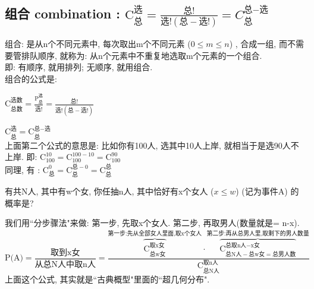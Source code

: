 \documentclass[UTF8]{ctexart}
\begin{document}
	
	
	
	

	\subsection{组合 combination : $
		\text{C}_{\text{总}}^{\text{选}}=\frac{\text{总!}}{\text{选!}\left( \text{总}-\text{选!} \right)}	= C_{\text{总}}^{\text{总}-\text{选}}	$}
	
	组合: 是从n个不同元素中, 每次取出m个不同元素 ($0 \leq m \leq n$) , 合成一组, 而不需要管排队顺序, 就称为: 从n个元素中不重复地选取m个元素的一个组合. \\
	
	即: 有顺序, 就用排列; 无顺序, 就用组合. \\
	
	组合的公式是: 
	
$\boxed{
		\text{C}_{\text{总数}}^{\text{选数}}=\frac{\text{P}_{\text{总}}^{\text{选}}}{\text{选!}}=\frac{\text{总!}}{\text{选!}\left( \text{总}-\text{选!} \right)}	
}$

$\boxed{
		\text{C}_{\text{总}}^{\text{选}}=\text{C}_{\text{总}}^{\text{总}-\text{选}}	
}$ \\

上面第二个公式的意思是: 比如你有100人, 选其中10人上岸, 就相当于是选90人不上岸. 即: $\text{C}_{100}^{10}=\text{C}_{100}^{100-10}=\text{C}_{100}^{90}
$ \\

同理, 有 : $
\boxed{\text{C}_{\text{总}}^{0}=\text{C}_{\text{总}}^{\text{总}-0}=\text{C}_{\text{总}}^{\text{总}}
}$ \\
	
	
	\begin{myEnvSample}
		有共N人, 其中有w个女, 你任抽n人, 其中恰好有x个女人 ($x \leq w$) (记为事件A) 的概率是? 
		
		我们用``分步骤法"来做: 第一步, 先取x个女人. 第二步, 再取男人(数量就是= n-x). \\

$
\text{P(A)}=\dfrac{\text{取到x女}}{\text{从总N人中取n人}}=\dfrac{\overset{\text{第一步:先从全部女人里面,取x个女人}}{\overbrace{\text{C}_{\text{总w女}}^{\text{取x女}}}}\cdot \overset{\text{第二步:再从总男人里,取剩下的男人数量}}{\overbrace{\text{C}_{\text{总N人}-\text{总w女}=\text{总男人数}}^{\text{总取n人}-\text{x女}}}}}{\text{C}_{\text{总N人}}^{\text{取n人}}}
$ \\

上面这个公式, 其实就是``古典概型"里面的``超几何分布".
	\end{myEnvSample}
	
\end{document}
